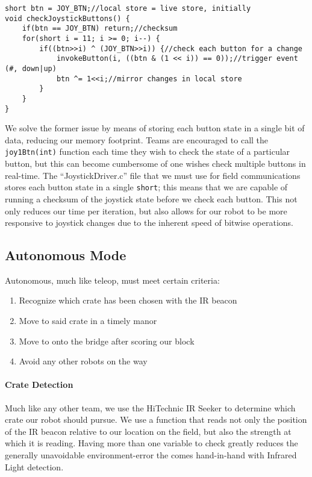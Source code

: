\begin{lstlisting}[tabsize=4]
short btn = JOY_BTN;//local store = live store, initially
void checkJoystickButtons() {
	if(btn == JOY_BTN) return;//checksum
	for(short i = 11; i >= 0; i--) {
		if((btn>>i) ^ (JOY_BTN>>i)) {//check each button for a change
			invokeButton(i, ((btn & (1 << i)) == 0));//trigger event (#, down|up)
			btn ^= 1<<i;//mirror changes in local store
		}
	}
}
\end{lstlisting}

We solve the former issue by means of storing each button state in a single bit of data, reducing our memory footprint. Teams are encouraged to call the \lstinline{joy1Btn(int)}{} function each time they wish to check the state of a particular button, but this can become cumbersome of one wishes check multiple buttons in real-time. The ``JoystickDriver.c'' file that we must use for field communications stores each button state in a single \lstinline{short}{}; this means that we are capable of running a checksum of the joystick state before we check each button. This not only reduces our time per iteration, but also allows for our robot to be more responsive to joystick changes due to the inherent speed of bitwise operations.

\newpage \subsection{Autonomous Mode}
Autonomous, much like teleop, must meet certain criteria: \begin{enumerate}
	\item{Recognize which crate has been chosen with the IR beacon}
	\item{Move to said crate in a timely manor}
	\item{Move to onto the bridge after scoring our block}
	\item{Avoid any other robots on the way}
\end{enumerate}

\paragraph{Crate Detection} Much like any other team, we use the HiTechnic IR Seeker to determine which crate our robot should pursue. We use a function that reads not only the position of the IR beacon relative to our location on the field, but also the strength at which it is reading. Having more than one variable to check greatly reduces the generally unavoidable environment-error the comes hand-in-hand with Infrared Light detection.

